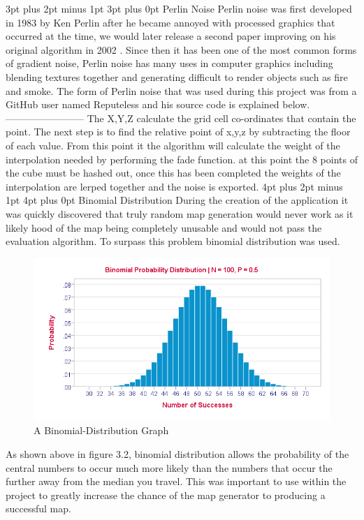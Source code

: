 \documentclass[12pt,a4paper,oneside]{book}
\makeatletter
\renewcommand\subsection{\@startsection {subsection}{1}{2mm} %
                               {3pt plus 2pt minus 1pt} %
                               {3pt plus 0pt} %
                               {\normalfont\bfseries}}
\renewcommand\section{\@startsection {section}{1}{0mm} %
                               {4pt plus 2pt minus 1pt} %
                               {4pt plus 0pt} %
                               {\bfseries}}
\makeatother
\begin{document}
\subsection{Perlin Noise}
Perlin noise was first developed in 1983 by Ken Perlin after he became annoyed with processed graphics that occurred at the time, we would later release a second paper improving on his original algorithm in 2002 \cite{Noise}. Since then it has been one of the most common forms of gradient noise, Perlin noise has many uses in computer graphics including blending textures together and generating difficult to render objects such as fire and smoke. The form of Perlin noise that was used during this project was from a GitHub user named Reputeless and his source code is explained below. ------------------------
\vspace{5mm} 
\newline
The X,Y,Z calculate the grid cell co-ordinates that contain the point. The next step is to find the relative point of x,y,z by subtracting the floor of each value. From this point it the algorithm will calculate the weight of the interpolation needed by performing the fade function. at this point the 8 points of the cube must be hashed out, once this has been completed the weights of the interpolation are lerped together and the noise is exported. 
\section{Binomial Distribution }
During the creation of the application it was quickly discovered that truly random map generation would never work as it likely hood of the map being completely unusable and would not pass the evaluation algorithm. To surpass this problem binomial distribution was used.
\begin{figure}[h]
	\includegraphics[width=1.0\textwidth]{images/binomial.png}
	\caption{A Binomial-Distribution Graph}
\end{figure}
\vspace{5mm} 
\newline
As shown above in figure 3.2, binomial distribution allows the probability of the central numbers to occur much more likely than the numbers that occur the further away from the median you travel. This was important to use within the project to greatly increase the chance of the map generator to producing a successful map. 
\vspace{5mm} 
\newline
\end{document}
